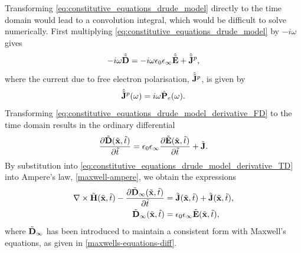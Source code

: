 Transforming \eqref{eq:constitutive_equations_drude_model} directly to the time domain would lead to a convolution integral, which would be difficult to solve numerically. First multiplying \eqref{eq:constitutive_equations_drude_model} by $ -i \omega$ gives
\begin{equation}
\label{eq:constitutive_equations_drude_model_derivative_FD}
- i \omega \hat{\tilde{\mathbf{D}}} = -i \omega \epsilon_0 \epsilon_{\infty} \hat{\tilde{\mathbf{E}}} + \hat{\tilde{\mathbf{J}}}^p,
\end{equation}
where the current due to free electron polarisation, $\hat{\tilde{\mathbf{J}}}^p$, is given by
\begin{equation}
\label{eq:drude-free-elect-current-defn}
\hat{\tilde{\mathbf{J}}}^p(\omega) = i \omega \hat{\mathbf{P}}_e(\omega) .
\end{equation}
Transforming \eqref{eq:constitutive_equations_drude_model_derivative_FD} to the time domain results in the ordinary differential
\begin{equation}
\label{eq:constitutive_equations_drude_model_derivative_TD}
\frac{\partial \tilde{\mathbf{D}} (\tilde{\mathbf{x}},\tilde{t}) }{\partial \tilde{t}}= \epsilon_0 \epsilon_{\infty} \frac{\partial \tilde{\mathbf{E}} (\tilde{\mathbf{x}}, \tilde{t}) }{\partial \tilde{t}} + \tilde{\mathbf{J}} .
\end{equation}
By substitution into \eqref{eq:constitutive_equations_drude_model_derivative_TD} into Ampere's law, \eqref{maxwell-ampere}, we obtain the expressions
\begin{subequations}
\label{eq:drude-ampere}
    \begin{align}
        \nabla \times \tilde{\mathbf{H}}(\tilde{\mathbf{x}},\tilde{t}) - \frac{\partial\tilde{\mathbf{D}}_{\infty}(\tilde{\mathbf{x}}, \tilde{t})}{\partial \tilde{t}} &= \tilde{\mathbf{J}}(\tilde{\mathbf{x}},\tilde{t}) + \tilde{\mathbf{J}}(\tilde{\mathbf{x}},\tilde{t}) , \\
        \tilde{\mathbf{D}}_{\infty}(\tilde{\mathbf{x}}, \tilde{t}) &= \epsilon_0 \epsilon_{\infty} \tilde{\mathbf{E}}(\tilde{\mathbf{x}}, \tilde{t}),
    \end{align}
\end{subequations}
where $\tilde{\mathbf{D}}_{\infty}$ has been introduced to maintain a consistent form with Maxwell's equations, as given in \eqref{maxwells-equations-diff}.

